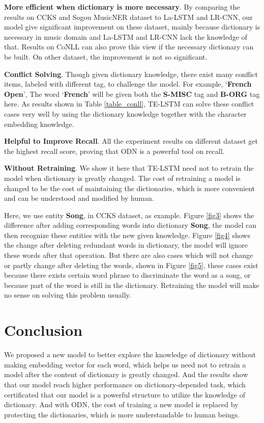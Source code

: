 \documentclass[letterpaper]{article} %
\begin{document}
\textbf{More efficient when dictionary is more necessary}. By comparing the results on CCKS and Sogou MusicNER dataset to La-LSTM and LR-CNN, our model give significant improvement on these dataset, mainly because dictionary is necessary in music domain and La-LSTM and LR-CNN lack the knowledge of that. Results on CoNLL can also prove this view if the necessary dictionary can be built. On other dataset, the improvement is not so significant.

\textbf{Conflict Solving}. Though given dictionary knowledge, there exist many conflict items, labeled with different tag, to challenge the model. For example, `\textbf{French Open}', The word `\textbf{French}' will be given both the \textbf{S-MISC} tag and \textbf{B-ORG} tag here. As results shown in Table \ref{table_conll}, TE-LSTM can solve these conflict cases very well by using the dictionary knowledge together with the character embedding knowledge.

\textbf{Helpful to Improve Recall}. All the experiment results on different dataset get the highest recall score, proving that ODN is a powerful tool on recall.

\textbf{Without Retraining}. We show it here that TE-LSTM need not to retrain the model when dictionary is greatly changed. The cost of retraining a model is changed to be the cost of maintaining the dictionaries, which is more convenient and can be understood and modified by human. 

Here, we use entity \textbf{Song}, in CCKS dataset, as example. Figure \ref{fig3} shows the difference after adding corresponding words into dictionary \textbf{Song}, the model can then recognize these entities with the new given knowledge. Figure \ref {fig4} shows the change after deleting redundant words in dictionary, the model will ignore these words after that operation. But there are also cases which will not change or partly change after deleting the words, shown in Figure \ref{fig5},  these cases exist because there exists certain word phrase to discriminate the word as a song,  or because part of the word is still in the dictionary. Retraining the model will make no sense on solving this problem usually.


\section{Conclusion}

We proposed a new model to better explore the knowledge of dictionary without making embedding vector for each word, which helps us need not to retrain a model after the content of dictionary is greatly changed. And the results show that our model reach higher performance on dictionary-depended task, which certificated that our model is a powerful structure to utilize the knowledge of dictionary. And with ODN, the cost of training a new model is replaced by protecting the dictionaries, which is more understandable to human beings.
\end{document}

